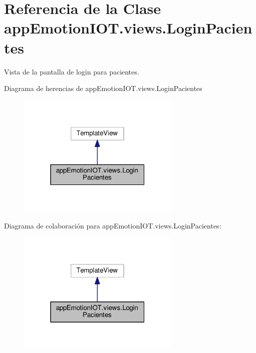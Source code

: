 \hypertarget{classappEmotionIOT_1_1views_1_1LoginPacientes}{}\section{Referencia de la Clase app\+Emotion\+I\+O\+T.\+views.\+Login\+Pacientes}
\label{classappEmotionIOT_1_1views_1_1LoginPacientes}


Vista de la pantalla de login para pacientes.  




Diagrama de herencias de app\+Emotion\+I\+O\+T.\+views.\+Login\+Pacientes
\nopagebreak
\begin{figure}[H]
\begin{center}
\leavevmode
\includegraphics[width=220pt]{classappEmotionIOT_1_1views_1_1LoginPacientes__inherit__graph}
\end{center}
\end{figure}


Diagrama de colaboración para app\+Emotion\+I\+O\+T.\+views.\+Login\+Pacientes\+:
\nopagebreak
\begin{figure}[H]
\begin{center}
\leavevmode
\includegraphics[width=220pt]{classappEmotionIOT_1_1views_1_1LoginPacientes__coll__graph}
\end{center}
\end{figure}
